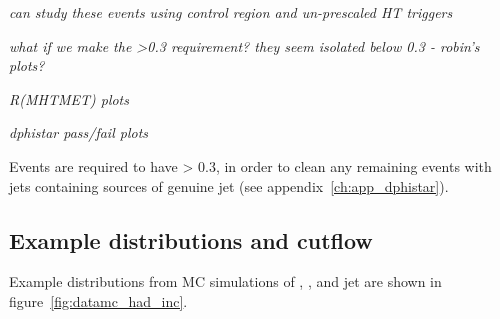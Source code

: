 \emph{can study these events using control region and un-prescaled HT triggers}

\emph{what if we make the >0.3 requirement? they seem isolated below 0.3 -
robin's plots?}

\emph{R(MHTMET) plots}

\emph{dphistar pass/fail plots}

Events are required to have \dphistar > 0.3, in
order to clean any remaining events with jets containing sources of genuine \met jet (see
appendix~\ref{ch:app_dphistar}).


\subsection{Example distributions and cutflow}

Example distributions from MC simulations of \alphat, \HT, \mht and jet \Pt  are
shown in figure~\ref{fig:datamc_had_inc}.

